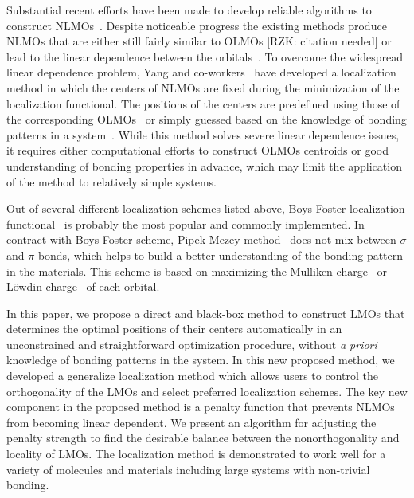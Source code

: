 \documentclass[aps,prl,reprint,amsmath,amssymb]{revtex4-1}
\begin{document}
Substantial recent efforts have been made to develop reliable algorithms to construct NLMOs~\cite{feng2004An_efficient, liu2000nonorthogonal, peng2013effective, hoyvik2017generalising}. %
%
Despite noticeable progress the existing methods produce NLMOs that are either still fairly similar to OLMOs [RZK: citation needed] or lead to the linear dependence between the orbitals~\cite{feng2004An_efficient}. 
To overcome the widespread linear dependence problem, Yang and co-workers~\cite{feng2004An_efficient, cui2010efficient} have developed a localization method in which the centers of NLMOs are fixed during the minimization of the localization functional. 
The positions of the centers are predefined using those of the corresponding OLMOs~\cite{feng2004An_efficient} or simply guessed based on the knowledge of bonding patterns in a system~\cite{cui2010efficient}. %
While this method solves severe linear dependence issues, it requires either computational efforts to construct OLMOs centroids or good understanding of bonding properties in advance, which may limit the application of the method to relatively simple systems.

Out of several different localization schemes listed above, Boys-Foster localization functional~\cite{boys1960construction} is probably the most popular and commonly implemented.
In contract with Boys-Foster scheme, Pipek-Mezey method~\cite{pipek1989a_fast} does not mix between $\sigma$ and $\pi$ bonds, which helps to build a better understanding of the bonding pattern in the materials.
This scheme is based on maximizing the Mulliken charge~\cite{11111} or L{\"o}wdin charge~\cite{2222} of each orbital.

In this paper, we propose a direct and black-box method to construct LMOs that determines the optimal positions of their centers automatically in an unconstrained and straightforward optimization procedure, without \emph{a priori} knowledge of bonding patterns in the system.
In this new proposed method, we developed a generalize localization method which allows users to control the orthogonality of the LMOs and select preferred localization schemes.
The key new component in the proposed method is a penalty function that prevents NLMOs from becoming linear dependent.  
We present an algorithm for adjusting the penalty strength to find the desirable balance between the nonorthogonality and locality of LMOs. 
The localization method is demonstrated to work well for a variety of molecules and materials including large systems with non-trivial bonding. 
\end{document}
